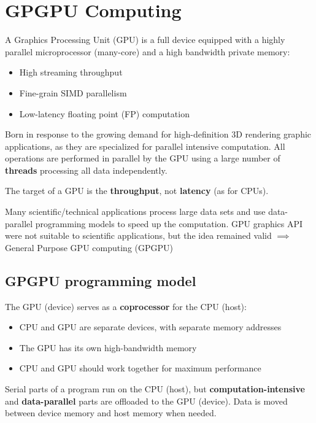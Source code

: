 \section{GPGPU Computing}

A Graphics Processing Unit (GPU) is a full device equipped with a highly parallel microprocessor (many-core) and a high bandwidth private memory:

\begin{itemize}
	\item High streaming throughput
	\item Fine-grain SIMD parallelism
	\item Low-latency floating point (FP) computation
\end{itemize}

Born in response to the growing demand for high-definition 3D rendering graphic applications, as they are specialized for parallel intensive computation. All operations are performed in parallel by the GPU using a large number of \textbf{threads} processing all data independently.

The target of a GPU is the \textbf{throughput}, not \textbf{latency} (as for CPUs).

Many scientific/technical applications process large data sets and use data-parallel programming models to speed up the computation. GPU graphics API were not suitable to scientific applications, but the idea remained valid $\implies$ General Purpose GPU computing (GPGPU)

\subsection{GPGPU programming model}

The GPU (device) serves as a \textbf{coprocessor} for the CPU (host):

\begin{itemize}
	\item CPU and GPU are separate devices, with separate memory addresses
	\item The GPU has its own high-bandwidth memory
	\item CPU and GPU should work together for maximum performance
\end{itemize}

Serial parts of a program run on the CPU (host), but \textbf{computation-intensive} and \textbf{data-parallel} parts are offloaded to the GPU (device). Data is moved between device memory and host memory when needed.

